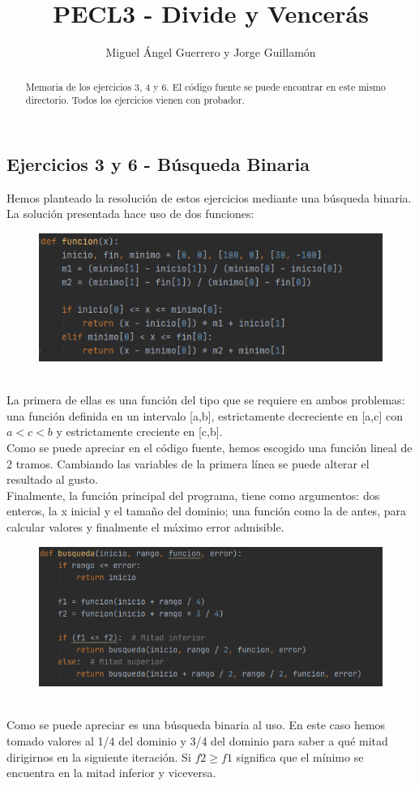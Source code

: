 \documentclass[]{report}
\title{PECL3 - Divide y Vencerás}
\author{Miguel Ángel Guerrero y Jorge Guillamón}
\begin{document}
\maketitle

\begin{abstract}
	Memoria de los ejercicios 3, 4 y 6. El código fuente se puede encontrar en este mismo directorio. Todos los ejercicios vienen con probador.
\end{abstract}
\subsection*{Ejercicios 3 y 6 - Búsqueda Binaria}
Hemos planteado la resolución de estos ejercicios mediante una búsqueda binaria. La solución presentada hace uso de dos funciones:
\begin{figure}[h!]
	\centering
	\includegraphics[width=1\linewidth]{1}
	\label{fig:1}
\end{figure}\\
La primera de ellas es una función del tipo que se requiere en ambos problemas: una función definida en un intervalo [a,b], estrictamente decreciente en [a,c] con $a<c<b$ y estrictamente creciente en [c,b].\\
Como se puede apreciar en el código fuente, hemos escogido una función lineal de 2 tramos. 
Cambiando las variables de la primera línea se puede alterar el resultado al gusto.
\\
Finalmente, la función principal del programa, tiene como argumentos: dos enteros, la x inicial y el tamaño del dominio; una función como la de antes, para calcular valores y finalmente el máximo error admisible.
\begin{figure}[h!]
	\centering
	\includegraphics[width=1\linewidth]{2}
	\caption{}
	\label{fig:2}
\end{figure}\\
Como se puede apreciar es una búsqueda binaria al uso. En este caso hemos tomado valores al 1/4 del dominio y 3/4 del dominio para saber a qué mitad dirigirnos en la siguiente iteración. Si $f2 \geq f1$ significa que el mínimo se encuentra en la mitad inferior y viceversa.\newpage
\end{document}
